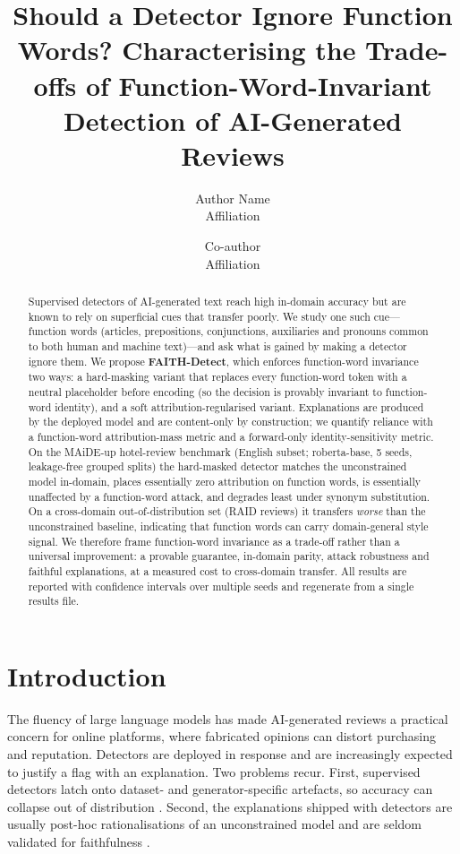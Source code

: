 \documentclass[11pt]{article}
\title{\textbf{Should a Detector Ignore Function Words? Characterising the Trade-offs of Function-Word-Invariant Detection of AI-Generated Reviews}}
\author{Author Name\\ \small Affiliation \and Co-author\\ \small Affiliation}
\date{}
\begin{document}
\maketitle
\begin{abstract}
Supervised detectors of AI-generated text reach high in-domain accuracy but are known to rely on superficial cues that transfer poorly. We study one such cue---function words (articles, prepositions, conjunctions, auxiliaries and pronouns common to both human and machine text)---and ask what is gained by making a detector ignore them. We propose \textbf{FAITH-Detect}, which enforces function-word invariance two ways: a hard-masking variant that replaces every function-word token with a neutral placeholder before encoding (so the decision is provably invariant to function-word identity), and a soft attribution-regularised variant. Explanations are produced by the deployed model and are content-only by construction; we quantify reliance with a function-word attribution-mass metric and a forward-only identity-sensitivity metric. On the MAiDE-up hotel-review benchmark (English subset; roberta-base, 5 seeds, leakage-free grouped splits) the hard-masked detector matches the unconstrained model in-domain, places essentially zero attribution on function words, is essentially unaffected by a function-word attack, and degrades least under synonym substitution. On a cross-domain out-of-distribution set (RAID reviews) it transfers \emph{worse} than the unconstrained baseline, indicating that function words can carry domain-general style signal. We therefore frame function-word invariance as a trade-off rather than a universal improvement: a provable guarantee, in-domain parity, attack robustness and faithful explanations, at a measured cost to cross-domain transfer. All results are reported with confidence intervals over multiple seeds and regenerate from a single results file.
\end{abstract}
\section{Introduction}
The fluency of large language models has made AI-generated reviews a practical concern for online platforms, where fabricated opinions can distort purchasing and reputation. Detectors are deployed in response and are increasingly expected to justify a flag with an explanation. Two problems recur. First, supervised detectors latch onto dataset- and generator-specific artefacts, so accuracy can collapse out of distribution \cite{raid,sadasivan}. Second, the explanations shipped with detectors are usually post-hoc rationalisations of an unconstrained model and are seldom validated for faithfulness \cite{jacovi}.
\end{document}
